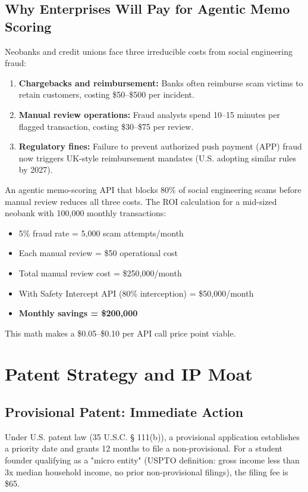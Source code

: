 \documentclass[12pt]{article}
\begin{document}
\subsection{Why Enterprises Will Pay for Agentic Memo Scoring}

Neobanks and credit unions face three irreducible costs from social engineering fraud:

\begin{enumerate}
    \item \textbf{Chargebacks and reimbursement:} Banks often reimburse scam victims to retain customers, costing \$50–\$500 per incident.
    \item \textbf{Manual review operations:} Fraud analysts spend 10–15 minutes per flagged transaction, costing \$30–\$75 per review.
    \item \textbf{Regulatory fines:} Failure to prevent authorized push payment (APP) fraud now triggers UK-style reimbursement mandates (U.S. adopting similar rules by 2027).
\end{enumerate}

An agentic memo-scoring API that blocks 80\% of social engineering scams before manual review reduces all three costs. The ROI calculation for a mid-sized neobank with 100,000 monthly transactions:

\begin{itemize}
    \item 5\% fraud rate = 5,000 scam attempts/month
    \item Each manual review = \$50 operational cost
    \item Total manual review cost = \$250,000/month
    \item With Safety Intercept API (80\% interception) = \$50,000/month
    \item \textbf{Monthly savings = \$200,000}
\end{itemize}

This math makes a \$0.05–\$0.10 per API call price point viable.

\newpage
\section{Patent Strategy and IP Moat}

\subsection{Provisional Patent: Immediate Action}

Under U.S. patent law (35 U.S.C. § 111(b)), a provisional application establishes a priority date and grants 12 months to file a non-provisional. For a student founder qualifying as a "micro entity" (USPTO definition: gross income less than 3x median household income, no prior non-provisional filings), the filing fee is \$65.
\end{document}
